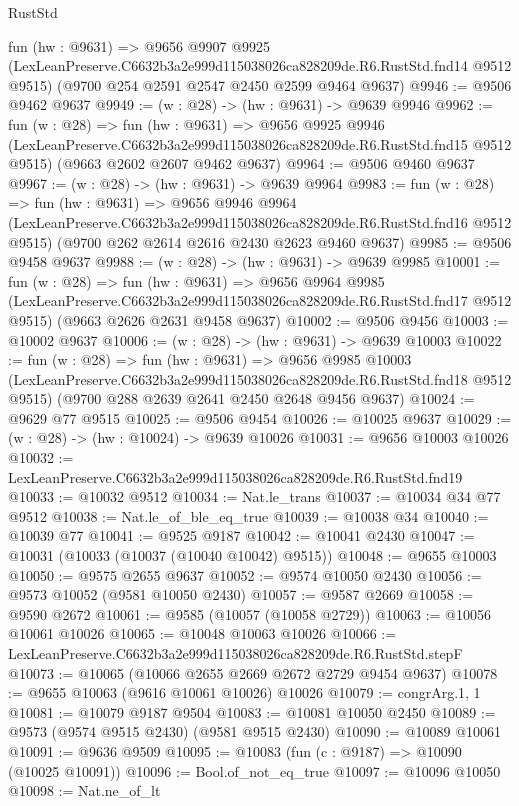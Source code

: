 \begin{lexlean}{RustStd}
\begin{coremodule}
  fun (hw : @9631) =>
  @9656
    @9907
    @9925
    (LexLeanPreserve.C6632b3a2e999d115038026ca828209de.R6.RustStd.fnd14 @9512 @9515)
    (@9700 @254 @2591 @2547 @2450 @2599 @9464 @9637)
@9946 := @9506 @9462 @9637
@9949 := (w : @28) -> (hw : @9631) -> @9639 @9946
@9962 := fun (w : @28) =>
  fun (hw : @9631) =>
  @9656
    @9925
    @9946
    (LexLeanPreserve.C6632b3a2e999d115038026ca828209de.R6.RustStd.fnd15 @9512 @9515)
    (@9663 @2602 @2607 @9462 @9637)
@9964 := @9506 @9460 @9637
@9967 := (w : @28) -> (hw : @9631) -> @9639 @9964
@9983 := fun (w : @28) =>
  fun (hw : @9631) =>
  @9656
    @9946
    @9964
    (LexLeanPreserve.C6632b3a2e999d115038026ca828209de.R6.RustStd.fnd16 @9512 @9515)
    (@9700 @262 @2614 @2616 @2430 @2623 @9460 @9637)
@9985 := @9506 @9458 @9637
@9988 := (w : @28) -> (hw : @9631) -> @9639 @9985
@10001 := fun (w : @28) =>
  fun (hw : @9631) =>
  @9656
    @9964
    @9985
    (LexLeanPreserve.C6632b3a2e999d115038026ca828209de.R6.RustStd.fnd17 @9512 @9515)
    (@9663 @2626 @2631 @9458 @9637)
@10002 := @9506 @9456
@10003 := @10002 @9637
@10006 := (w : @28) -> (hw : @9631) -> @9639 @10003
@10022 := fun (w : @28) =>
  fun (hw : @9631) =>
  @9656
    @9985
    @10003
    (LexLeanPreserve.C6632b3a2e999d115038026ca828209de.R6.RustStd.fnd18 @9512 @9515)
    (@9700 @288 @2639 @2641 @2450 @2648 @9456 @9637)
@10024 := @9629 @77 @9515
@10025 := @9506 @9454
@10026 := @10025 @9637
@10029 := (w : @28) -> (hw : @10024) -> @9639 @10026
@10031 := @9656 @10003 @10026
@10032 := LexLeanPreserve.C6632b3a2e999d115038026ca828209de.R6.RustStd.fnd19
@10033 := @10032 @9512
@10034 := Nat.le_trans
@10037 := @10034 @34 @77 @9512
@10038 := Nat.le_of_ble_eq_true
@10039 := @10038 @34
@10040 := @10039 @77
@10041 := @9525 @9187
@10042 := @10041 @2430
@10047 := @10031 (@10033 (@10037 (@10040 @10042) @9515))
@10048 := @9655 @10003
@10050 := @9575 @2655 @9637
@10052 := @9574 @10050 @2430
@10056 := @9573 @10052 (@9581 @10050 @2430)
@10057 := @9587 @2669
@10058 := @9590 @2672
@10061 := @9585 (@10057 (@10058 @2729))
@10063 := @10056 @10061 @10026
@10065 := @10048 @10063 @10026
@10066 := LexLeanPreserve.C6632b3a2e999d115038026ca828209de.R6.RustStd.stepF
@10073 := @10065 (@10066 @2655 @2669 @2672 @2729 @9454 @9637)
@10078 := @9655 @10063 (@9616 @10061 @10026) @10026
@10079 := congrArg.{1, 1}
@10081 := @10079 @9187 @9504
@10083 := @10081 @10050 @2450
@10089 := @9573 (@9574 @9515 @2430) (@9581 @9515 @2430)
@10090 := @10089 @10061
@10091 := @9636 @9509
@10095 := @10083 (fun (c : @9187) => @10090 (@10025 @10091))
@10096 := Bool.of_not_eq_true
@10097 := @10096 @10050
@10098 := Nat.ne_of_lt

\end{coremodule}
\end{lexlean}
